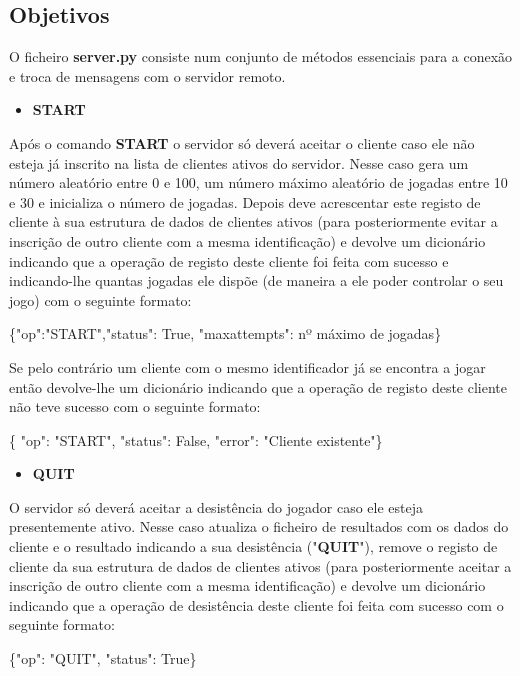 \documentclass{report}
\begin{document}
\subsection{Objetivos}
O ficheiro \textbf{server.py} consiste num conjunto de métodos essenciais para a conexão e troca de mensagens com o servidor remoto.
\newline
\begin{itemize}
	\item \textbf{START}
\end{itemize}
Após o comando \textbf{START} o servidor só deverá aceitar o cliente caso ele não esteja já inscrito na lista de clientes ativos do servidor. Nesse caso gera um número aleatório entre 0 e 100, um número máximo aleatório de jogadas entre 10 e 30 e inicializa o número de
jogadas. Depois deve acrescentar este registo de cliente à sua estrutura de dados
de clientes ativos (para posteriormente evitar a inscrição de outro cliente com a
mesma identificação) e devolve um dicionário indicando que a operação de registo
deste cliente foi feita com sucesso e indicando-lhe quantas jogadas ele dispõe (de
maneira a ele poder controlar o seu jogo) com o seguinte formato:
\newline

\{"op":"START","status": True, "max\textunderscore attempts": nº máximo de jogadas\}
\newline

Se pelo contrário um cliente com o mesmo identificador já se encontra a jogar então
devolve-lhe um dicionário indicando que a operação de registo deste cliente não
teve sucesso com o seguinte formato:
\newline

\{ "op": "START", "status": False, "error": "Cliente existente"\} 
\begin{itemize}
	\item \textbf{QUIT}
\end{itemize}
O servidor só deverá aceitar a desistência do jogador caso ele esteja presentemente
ativo. Nesse caso atualiza o ficheiro de resultados com os dados do cliente e o
resultado indicando a sua desistência ("\textbf{QUIT}"), remove o registo de cliente da sua estrutura de dados de clientes ativos (para posteriormente aceitar a inscrição de
outro cliente com a mesma identificação) e devolve um dicionário indicando que a
operação de desistência deste cliente foi feita com sucesso com o seguinte formato:
\newline

\{"op": "QUIT", "status": True\}
\newline
\end{document}
